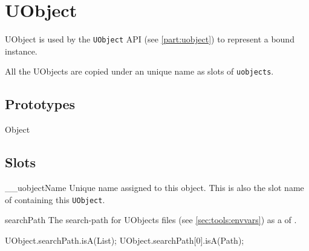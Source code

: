 
\section{UObject}

UObject is used by the \lstinline|UObject| API (see
\autoref{part:uobject}) to represent a bound \Cxx instance.

All the UObjects are copied under an unique name as slots of
\lstinline{uobjects}.

\subsection{Prototypes}
\begin{refObjects}
\item[Object]
\end{refObjects}

\subsection{Slots}

\begin{urbiscriptapi}
\item[__uobjectName]%
  Unique name assigned to this object. This is also the slot name of
   containing this \lstinline|UObject|.
\item[searchPath] The search-path for UObjects files
  (see \autoref{sec:tools:envvars}) as a  of
  .
\begin{urbiassert}
UObject.searchPath.isA(List);
UObject.searchPath[0].isA(Path);
\end{urbiassert}
\end{urbiscriptapi}


